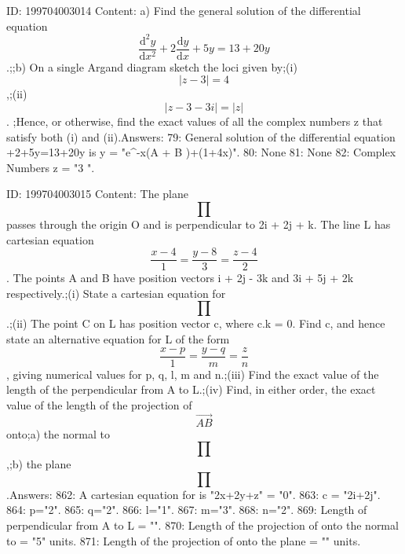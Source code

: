 \documentclass{article}
\begin{document}
ID: 199704003014
Content:
a) Find the general solution of the differential equation \[\frac{\mathrm{d}^{2} y}{\mathrm{d} x^{2}} + 2 \frac{\mathrm{d} y}{\mathrm{d} x} + 5y = 13 + 20y\].;;b) On a single Argand diagram sketch the loci given by;(i) \[|z - 3| = 4\],;(ii) \[|z - 3 - 3i| = |z|\]. ;Hence, or otherwise, find the exact values of all the complex numbers z that satisfy both (i) and (ii).Answers:
79: General solution of the differential equation +2+5y=13+20y is y = "e^{-x}(A  + B )+(1+4x)".
80: None
81: None
82: Complex Numbers z = "3  ".

ID: 199704003015
Content:
The plane \[\prod \] passes through the origin O and is perpendicular to 2i + 2j + k. The line L has cartesian equation \[\frac {x - 4}{1} = \frac {y - 8}{3} = \frac {z - 4}{2}\]. The points A and B have position vectors i + 2j - 3k and 3i + 5j + 2k respectively.;(i) State a cartesian equation for \[\prod \].;(ii) The point C on L has position vector c, where c.k = 0. Find c, and hence state an alternative equation for L of the form \[\frac {x - p}{1} = \frac {y - q}{m} = \frac {z}{n}\], giving numerical values for p, q, l, m and n.;(iii) Find the exact value of the length of the perpendicular from A to L.;(iv) Find, in either order, the exact value of the length of the projection of \[\overrightarrow{AB}\] onto;a) the normal to  \[\prod \],;b) the plane  \[\prod \].Answers:
862: A cartesian equation for \prod is "2x+2y+z" = "0".
863: c = "2i+2j".
864: p="2".
865: q="2".
866: l="1".
867: m="3".
868: n="2".
869: Length of perpendicular from A to L = "".
870: Length of the projection of  onto the normal to  \prod = "5" units.
871: Length of the projection of  onto the plane  \prod = "" units.
\end{document}
